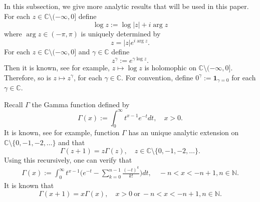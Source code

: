 \documentclass[12pt,oneside,english]{amsart}
\theoremstyle{plain}
\theoremstyle{definition}
\numberwithin{equation}{section}
\newcommand{\added}[1]{{\color{blue}#1}}\newcommand{\deleted}[1]{{\color{red}#1}}
\begin{document}
\added{
\subsection{}
	In this subsection, we give more analytic results that will be used in this paper.
	For each $z\in \mathbb C\setminus (-\infty,0]$ define
\[
	\log z := \log |z| + i \arg z
\]
	where $\arg z \in (-\pi,\pi)$ is uniquely determined by
\[
	z = |z|e^{i \arg z}.
\] 	
	For each $z\in \mathbb C\setminus (-\infty,0]$ and $\gamma \in \mathbb C$ define
\[
	z^\gamma := e^{\gamma \log z}.
\]
	Then it is known, see \cite[Theorem 6.1]{SteinShakarchi2003Complex} for example, $z\mapsto \log z$ is holomophic on $\mathbb C\setminus (-\infty,0]$.
	Therefore, so is $z\mapsto z^\gamma$, for each $\gamma \in \mathbb C$.
	For convention, define $0^\gamma := \mathbf 1_{\gamma = 0}$ for each $\gamma \in \mathbb C$.


    Recall $\Gamma$ the Gamma function defined by
\begin{equation}
    \Gamma (x) := \int_0^\infty t^{x-1} e^{-t}dt,
    \quad x>0.
\end{equation}
	It is known, see \cite[Theorem 6.1.3 and its following remark]{SteinShakarchi2003Complex} for example, function $\Gamma$ has an unique analytic extension on $\mathbb C\setminus\{0, -1,-2,\dots\}$ and that
\[
	\Gamma(z+1) = z \Gamma(z),\quad z\in \mathbb C\setminus\{0, -1,-2,\dots\}.
\]
	Using this recursively, one can verify that
\begin{align}
\label{eq: definition of Gamma function}
    \Gamma(x)
    := \int_0^\infty t^{x-1} \Big(e^{-t} - \sum_{k=0}^{n-1} \frac{(-t)^k}{k!}\Big) dt,
    \quad -n< x< -n+1, n\in \mathbb N.
\end{align}
    It is known that
\begin{equation}
    \Gamma(x+1) = x\Gamma(x),
    \quad x>0~\text{or}~-n< x< -n+1, n\in \mathbb N.
\end{equation}

}
\end{document}
